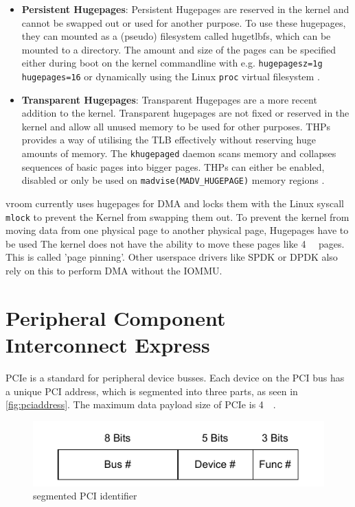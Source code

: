 \begin{itemize}
    \item \textbf{Persistent Hugepages}: Persistent Hugepages are reserved in the kernel and cannot be swapped out or used for another purpose. To use these hugepages, they can mounted as a (pseudo) filesystem called hugetlbfs, which can be mounted to a directory. The amount and size of the pages can be specified either during boot on the kernel commandline with e.g. \texttt{hugepagesz=1g hugepages=16} or dynamically using the Linux \texttt{proc} virtual filesystem \cite{hugetlbkerneldocs}.
    \item \textbf{Transparent Hugepages}: Transparent Hugepages are a more recent addition to the kernel. Transparent hugepages are not fixed or reserved in the kernel and allow all unused memory to be used for other purposes. THPs provides a way of utilising the TLB effectively without reserving huge amounts of memory. The \texttt{khugepaged} daemon scans memory and collapses sequences of basic pages into bigger pages. THPs can either be enabled, disabled or only be used on \texttt{madvise(MADV\_HUGEPAGE)} memory regions \cite{transhugekerneldocs}.
\end{itemize}

vroom currently uses hugepages for DMA and locks them with the Linux syscall \texttt{mlock} to prevent the Kernel from swapping them out.
To prevent the kernel from moving data from one physical page to another physical page, Hugepages have to be used The kernel does not have the ability to move these pages like \qty{4}{\kibi\byte} pages. This is called 'page pinning'. Other userspace drivers like SPDK or DPDK also rely on this to perform DMA without the IOMMU.

\section{Peripheral Component Interconnect Express}
PCIe is a standard for peripheral device busses. Each device on the PCI bus has a unique PCI address, which is segmented into three parts, as seen in \autoref{fig:pciaddress}. The maximum data payload size of PCIe is \qty{4}{\kibi\byte}.

\begin{figure}[H]
    \centering
    \includegraphics[width=.7\textwidth]{figures/pciaddress.pdf}
    \caption{segmented PCI identifier}
    \label{fig:pciaddress}
\end{figure}

